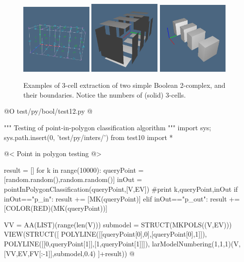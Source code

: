 \documentclass[11pt,oneside]{article}    %
\begin{document}
\begin{figure}[htbp]
   \includegraphics[height=0.332\textwidth,width=0.32\textwidth]{images/test11c1} 
   \includegraphics[height=0.332\textwidth,width=0.32\textwidth]{images/test11c2} 
   \includegraphics[height=0.332\textwidth,width=0.32\textwidth]{images/test11c3} 
   \caption{Examples of 3-cell extraction of two simple Boolean 2-complex, and their boundaries. Notice the numbers of (solid) 3-cells.}
   \label{fig:example}
\end{figure}


@O test/py/bool/test12.py @{
""" Testing of point-in-polygon classification algorithm """
import sys; 
sys.path.insert(0, 'test/py/inters/')
from test10 import *

@< Point in polygon testing @>

result = []
for k in range(10000):
    queryPoint = [random.random(),random.random()]
    inOut = pointInPolygonClassification(queryPoint,[V,EV])
    #print k,queryPoint,inOut
    if inOut=="p_in": result += [MK(queryPoint)]
    elif inOut=="p_out": result += [COLOR(RED)(MK(queryPoint))]

VV = AA(LIST)(range(len(V)))
submodel = STRUCT(MKPOLS((V,EV)))
VIEW(STRUCT([
    POLYLINE([[queryPoint[0],0],[queryPoint[0],1]]),
    POLYLINE([[0,queryPoint[1]],[1,queryPoint[1]]]),
    larModelNumbering(1,1,1)(V,[VV,EV,FV[:-1]],submodel,0.4)
    ]+result))
@}
\end{document}
